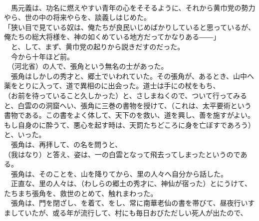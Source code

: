 \documentclass[
  paper=a5,
  fontsize=10pt,
  jafontsize=9.5pt,
  tate,                  %
  open_bracket_pos=nibu, %
]{jlreq}
\begin{document}
\\


　馬元義は、功名に燃えやすい青年の心をそそるように、それから黄巾党の勢力やら、世の中の将来やらを、談義しはじめた。\\


「狭い目で見ている奴は、俺たちが良民いじめばかりしていると思っているが、俺たちの総大将様を、神の如くめている地方だってかなりある――」\\


　と、して、まず、黄巾党の起りから説きだすのだった。\\


　今から十年ほど前。\\


　（河北省）の人で、張角という無名の士があった。\\


　張角はしかしの秀才と、郷土でいわれていた。その張角が、あるとき、山中へ薬をとりに入って、道で異相のに出会った。道士は手にの杖をもち、\\


（お前を待っていること久しかった）と、さしまねくので、ついて行ってみると、白雲のの洞窟へい、張角に三巻の書物を授けて、（これは、太平要術という書物である。この書をよく体して、天下のを救い、道を興し、善を施すがよい。もし自身のに酔うて、悪心を起す時は、天罰たちどころに身を亡ぼすであろう）と、いった。\\


　張角は、再拝して、の名を問うと、\\


（我はなり）と答え、姿は、一の白雲となって飛去ってしまったというのである。\\


　張角は、そのことを、山を降りてから、里の人々へ自分から話した。\\


　正直な、里の人々は、（わしらの郷土の秀才に、神仙が宿った）とにうけて、たちまち張角を、救世のとめて、触れまわった。\\


　張角は、門を閉ざし、を着て、をし、常に南華老仙の書を帯びて、昼夜行いすましていたが、或る年が流行して、村にも毎日おびただしい死人が出たので、\\
\end{document}
